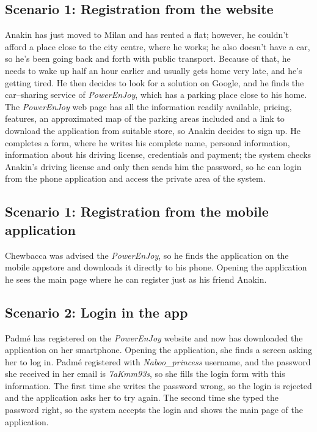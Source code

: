 \subsection{Scenario 1: Registration from the website}
	Anakin has just moved to Milan and has rented a flat; however, he couldn't afford a place close to the city centre, where he works; he also doesn't have a car, so he's been going back and forth with public transport. Because of that, he needs to wake up half an hour earlier and usually gets home very late, and he's getting tired. He then decides to look for a solution on Google, and he finds the car–sharing service of \textit{PowerEnJoy}, which has a parking place close to his home. The \textit{PowerEnJoy} web page has all the information readily available, pricing, features, an approximated map of the parking areas included and a link to download the application from suitable store, so Anakin decides to sign up. He completes a form, where he writes his complete name, personal information, information about his driving license, credentials and payment; the system checks Anakin's driving license and only then sends him the password, so he can login from the phone application and access the private area of the system. 

\subsection{Scenario 1: Registration from the mobile application}
	Chewbacca was advised the \textit{PowerEnJoy}, so he finds the application on the mobile appstore and downloads it directly to his phone. Opening the application he sees the main page where he can register just as his friend Anakin.  
		
\subsection{Scenario 2: Login in the app}
	Padmé has registered on the \textit{PowerEnJoy} website and now has downloaded the application on her smartphone. Opening the application, she finds a screen asking her to log in. Padmé registered with \textit{Naboo\_princess} username, and the password she received in her email is \textit{7aKmm93s}, so she fills the login form with this information. The first time she writes the password wrong, so the login is rejected and the application asks her to try again. The second time she typed the password right, so the system accepts the login and shows the main page of the application.
	
